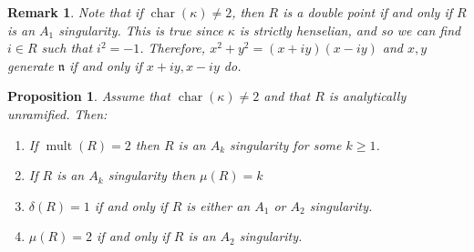\documentclass{article}
\newtheorem{proposition}[theorem]{Proposition}
\newtheorem{remark}[theorem]{Remark}
\DeclareMathOperator{\chara}{char}
\DeclareMathOperator{\mult}{mult}
\numberwithin{theorem}{section}
\begin{document}
\begin{remark}\label{rem:A_1_doublept}
    \textup{Note that if $\chara(\kappa) \neq 2$, then $R$ is a double point if and only if $R$ is an $A_1$ singularity. This is true since $\kappa$ is strictly henselian, and so we can find $i \in R$ such that $i^2=-1$. Therefore, $x^2+y^2=(x+iy)(x-iy)$ and $x,y $ generate $\mathfrak{n}$ if and only if $x+iy, x-iy$ do. }
\end{remark}


\begin{proposition}\label{cor:delta1}
    Assume that $\chara(\kappa) \neq 2$ and that $R$ is analytically unramified. Then:
    \begin{enumerate}
        \item If $\mult(R)=2$ then $R$ is an $A_k$ singularity for some $k \geq 1$.
        \item If $R$ is an $A_k$ singularity then $\mu(R)=k$
        \item $\delta(R)=1$ if and only if $R$ is either an $A_1$ or $A_2$ singularity.
        \item $\mu(R) = 2$ if and only if $R$ is an $A_2$ singularity.
    \end{enumerate} 
\end{proposition}
\end{document}

